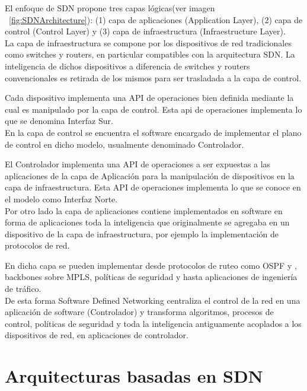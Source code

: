 El enfoque de SDN propone tres capas lógicas(ver imagen ~\ref{fig:SDNArchitecture}): (1) capa de aplicaciones (Application Layer), (2) capa de control (Control Layer) y (3) capa de infraestructura (Infraestructure Layer).\\

La capa de infraestructura se compone por los dispositivos de red tradicionales como switches y routers, en particular compatibles con la arquitectura SDN. La inteligencia de dichos dispositivos a diferencia de switches y routers convencionales es retirada de los mismos para ser trasladada a la capa de control.

Cada dispositivo implementa una API de operaciones bien definida mediante la cual es manipulado por la capa de control. Esta api de operaciones implementa lo que se denomina Interfaz Sur.
\\

En la capa de control se encuentra el software encargado de implementar el plano de control en dicho modelo, usualmente denominado Controlador.

El Controlador implementa una API de operaciones a ser expuestas a las aplicaciones de la capa de Aplicación para la manipulación de dispositivos en la capa de infraestructura. Esta API de operaciones implementa lo que se conoce en el modelo como Interfaz Norte.\\

Por otro lado la capa de aplicaciones contiene implementados en software en forma de aplicaciones toda la inteligencia que originalmente se agregaba en un dispositivo de la capa de infraestructura, por ejemplo la implementaci\'on de protocolos de red.

En dicha capa se pueden implementar desde protocolos de ruteo como OSPF y , backbones sobre MPLS, políticas de seguridad y hasta aplicaciones de ingeniería de tráfico.\\

De esta forma Software Defined Networking centraliza el control de la red en una aplicación de software (Controlador) y transforma algoritmos, procesos de control, políticas de seguridad y toda la inteligencia antiguamente acoplados a los dispositivos de red, en aplicaciones de controlador.\\

\section{Arquitecturas basadas en SDN}
\label{section2.3}

